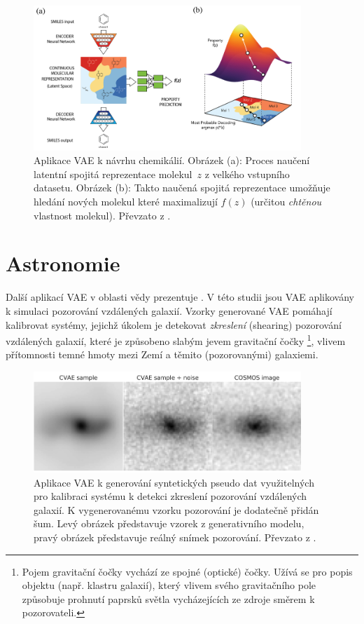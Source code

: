 \begin{figure}[H]
    \centering
    \includegraphics[width=0.9\textwidth]{figures/applications/vae_molecule_design_gomez.png}
    \caption{Aplikace VAE k návrhu chemikálií. Obrázek (a): Proces naučení latentní spojitá reprezentace molekul $z$ z velkého vstupního datasetu. Obrázek (b): Takto naučená spojitá reprezentace umožňuje hledání nových molekul které maximalizují $f(z)$ (určitou \emph{chtěnou} vlastnost molekul). Převzato z \cite{GomezBombarelli2018}.}
    \label{fig:vae_molecule_design_gomez}
\end{figure}

\newpage
\section{Astronomie}
Další aplikací VAE v oblasti vědy prezentuje \cite{Ravanbakhsh2016}.
V této studii jsou VAE aplikovány k simulaci pozorování vzdálených galaxií.
Vzorky generované VAE pomáhají kalibrovat systémy, jejichž úkolem je detekovat \emph{zkreslení} (shearing) pozorování vzdálených galaxií, které je způsobeno slabým jevem gravitační čočky
\footnote{Pojem gravitační čočky vychází ze spojné (optické) čočky. Užívá se pro popis objektu (např. klastru galaxií), který vlivem svého gravitačního pole způsobuje prohnutí paprsků světla vycházejících ze zdroje směrem k pozorovateli.},
vlivem přítomnosti temné hmoty mezi Zemí a těmito (pozorovanými) galaxiemi. \cite{Kingma2019}

\begin{figure}[H]
    \centering
    \includegraphics[width=0.9\textwidth]{figures/applications/vae_space_pseudodata_ravanbakhsh.png}
    \caption{Aplikace VAE k generování syntetických pseudo dat využitelných pro kalibraci systému k detekci zkreslení pozorování vzdálených galaxií. K vygenerovanému vzorku pozorování je dodatečně přidán šum. Levý obrázek představuje vzorek z generativního modelu, pravý obrázek představuje reálný snímek pozorování. Převzato z \cite{Ravanbakhsh2016}.}
    \label{fig:vae_space_pseudodata_ravanbakhsh}
\end{figure}


